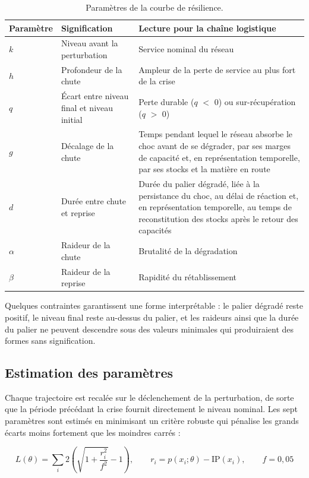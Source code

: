 \begin{table}[htbp]
\caption{Paramètres de la courbe de résilience.}
\label{tab:d6}
\footnotesize
\begin{tabularx}{\textwidth}{@{}P{1.4cm}P{3.4cm}L@{}}
\toprule
\textbf{Paramètre} & \textbf{Signification} & \textbf{Lecture pour la chaîne logistique} \\
\midrule
$k$ & Niveau avant la perturbation & Service nominal du réseau \\
$h$ & Profondeur de la chute & Ampleur de la perte de service au plus fort de la crise \\
$q$ & Écart entre niveau final et niveau initial & Perte durable ($q$ $<$ 0) ou sur-récupération ($q$ $>$ 0) \\
$g$ & Décalage de la chute & Temps pendant lequel le réseau absorbe le choc avant de se dégrader, par ses marges de capacité et, en représentation temporelle, par ses stocks et la matière en route \\
$d$ & Durée entre chute et reprise & Durée du palier dégradé, liée à la persistance du choc, au délai de réaction et, en représentation temporelle, au temps de reconstitution des stocks après le retour des capacités \\
$\alpha$ & Raideur de la chute & Brutalité de la dégradation \\
$\beta$ & Raideur de la reprise & Rapidité du rétablissement \\
\bottomrule
\end{tabularx}
\end{table}

Quelques contraintes garantissent une forme interprétable : le palier dégradé reste positif, le niveau final reste au-dessus du palier, et les raideurs ainsi que la durée du palier ne peuvent descendre sous des valeurs minimales qui produiraient des formes sans signification.

\subsection{Estimation des paramètres}
\label{sec:4.2}

Chaque trajectoire est recalée sur le déclenchement de la perturbation, de sorte que la période précédant la crise fournit directement le niveau nominal. Les sept paramètres sont estimés en minimisant un critère robuste qui pénalise les grands écarts moins fortement que les moindres carrés :

\begin{equation}
L(\theta) = \sum_{i} 2\left(\sqrt{1 + \frac{r_i^2}{f^2}} - 1\right), \qquad r_i = p(x_i;\theta) - \mathrm{IP}(x_i), \qquad f = 0{,}05
\label{eq:6}
\end{equation}

